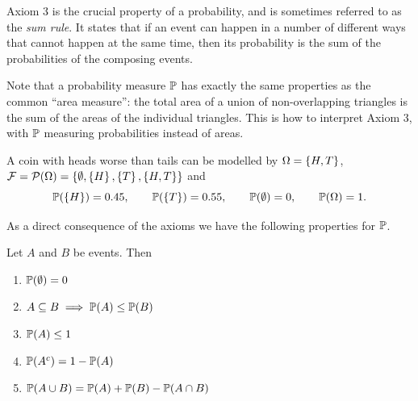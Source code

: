 Axiom 3 is the crucial property of a probability, and is sometimes referred to as the \emph{sum rule}. It states that if an event can happen in a number of different ways that cannot happen at the same time, then its probability is the sum of the probabilities of the composing events.

Note that a probability measure $\mathbb{P}$ has exactly the same properties as the common ``area measure'': the total area of a union of non-overlapping triangles is the sum of the areas of the individual triangles. This is how to interpret Axiom 3, with $\mathbb{P}$ measuring probabilities instead of areas.

\begin{example}\label{ex:unfair-coin}
A coin with heads worse than tails can be modelled by $\Omega = \left\{ H, T \right\}$, $\mathcal{F} = \mathcal{P}(\Omega) = \left\{ \emptyset, \left\{ H \right\}, \left\{ T \right\}, \left\{ H, T \right\} \right\}$ and
\[
  \mathbb{P}(\left\{ H \right\}) = 0.45, \qquad \mathbb{P}(\left\{ T \right\}) = 0.55, \qquad \mathbb{P}(\emptyset) = 0, \qquad \mathbb{P}(\Omega) = 1.
\]
\end{example}

As a direct consequence of the axioms we have the following properties for $\mathbb{P}$.

\begin{theorem}\label{thm:probability-properties}
Let $A$ and $B$ be events. Then
\begin{enumerate}
  \item $\mathbb{P}(\emptyset) = 0$
  \item $A \subseteq B \implies \mathbb{P}(A) \le \mathbb{P}(B)$
  \item $\mathbb{P}(A) \le 1$
  \item $\mathbb{P}(A^c) = 1 - \mathbb{P}(A)$
  \item $\mathbb{P}(A \cup B) = \mathbb{P}(A) + \mathbb{P}(B) - \mathbb{P}(A \cap B)$
\end{enumerate}
\end{theorem}

